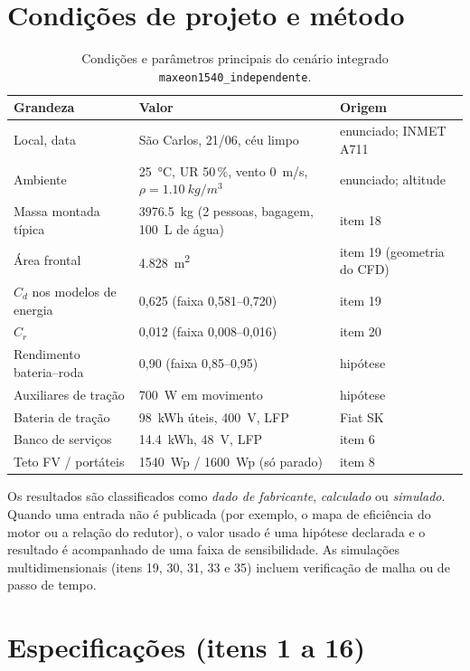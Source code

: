 \documentclass[11pt,a4paper]{article}
\newcommand{\cod}[1]{\texttt{\small #1}}
\begin{document}
\section{Condições de projeto e método}

\begin{table}[H]
\centering\small
\caption{Condições e parâmetros principais do cenário integrado \cod{maxeon1540\_independente}.}
\label{tab:cenario}
\begin{tabular}{lll}
\toprule
Grandeza & Valor & Origem \\
\midrule
Local, data & São Carlos, 21/06, céu limpo & enunciado; INMET A711 \\
Ambiente & \SI{25}{\celsius}, UR 50\,\%, vento \SI{0}{m/s}, $\rho = \SI{1,10}{kg/m^3}$ & enunciado; altitude \\
Massa montada típica & \SI{3976,5}{kg} (2 pessoas, bagagem, \SI{100}{L} de água) & item 18 \\
Área frontal & \SI{4,828}{m^2} & item 19 (geometria do CFD) \\
$C_d$ nos modelos de energia & 0,625 (faixa 0,581--0,720) & item 19 \\
$C_r$ & 0,012 (faixa 0,008--0,016) & item 20 \\
Rendimento bateria--roda & 0,90 (faixa 0,85--0,95) & hipótese \\
Auxiliares de tração & \SI{700}{W} em movimento & hipótese \\
Bateria de tração & \SI{98}{kWh} úteis, \SI{400}{V}, LFP & Fiat SK \cite{fiatsk} \\
Banco de serviços & \SI{14,4}{kWh}, \SI{48}{V}, LFP & item 6 \\
Teto FV / portáteis & \SI{1540}{Wp} / \SI{1600}{Wp} (só parado) & item 8 \\
\bottomrule
\end{tabular}
\end{table}

Os resultados são classificados como \emph{dado de fabricante}, \emph{calculado} ou
\emph{simulado}. Quando uma entrada não é publicada (por exemplo, o mapa de eficiência
do motor ou a relação do redutor), o valor usado é uma hipótese declarada e o resultado
é acompanhado de uma faixa de sensibilidade. As simulações multidimensionais (itens 19,
30, 31, 33 e 35) incluem verificação de malha ou de passo de tempo.

\section{Especificações (itens 1 a 16)}
\end{document}
